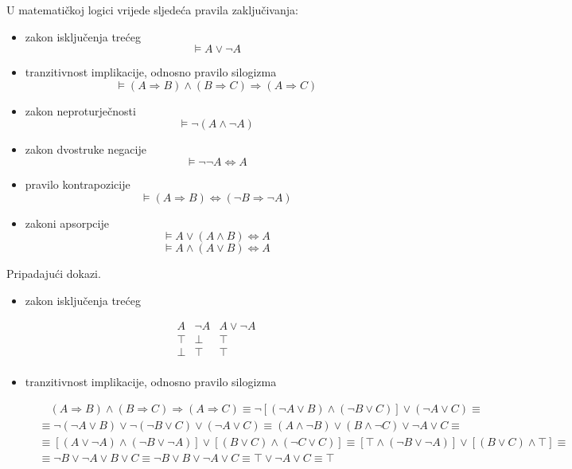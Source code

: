 \documentclass{article}
\begin{document}
\begin{enumerate}
U matematičkoj logici vrijede sljedeća pravila zaključivanja:
\begin{itemize}
\item zakon isključenja trećeg
$$\vDash A\lor\neg A$$
\item tranzitivnost implikacije, odnosno pravilo silogizma
$$\vDash ( A\Rightarrow B)\land(B\Rightarrow C)\Rightarrow(A\Rightarrow C)$$
\item zakon neproturječnosti
$$\vDash \neg( A\land\neg A)$$
\item zakon dvostruke negacije
$$\vDash \neg\neg A\Leftrightarrow A$$
\item pravilo kontrapozicije
$$\vDash(A\Rightarrow B)\Leftrightarrow(\neg B\Rightarrow\neg A)$$
\item zakoni apsorpcije
$$\vDash A\lor(A\land B)\Leftrightarrow A$$
$$\vDash A\land(A\lor B)\Leftrightarrow A$$
\end{itemize}

Pripadajući dokazi.

\begin{itemize}
\item zakon isključenja trećeg

\begin{displaymath}
\begin{array}{|c|c|c|}
A & \neg A & A\lor\neg A\\
\hline
\top & \bot & \top\\
\bot & \top & \top\\
\end{array}
\end{displaymath}

\item tranzitivnost implikacije, odnosno pravilo silogizma

\begin{align*}
&\quad(A\Rightarrow B)\land (B\Rightarrow C) \Rightarrow (A\Rightarrow C)\equiv \neg[(\neg A\lor B)\land (\neg B\lor C)]\lor(\neg A\lor C)\equiv\\
&\equiv\neg(\neg A\lor B)\lor\neg(\neg B\lor C)\lor(\neg A\lor C)\equiv(A\land\neg B)\lor (B\land\neg C)\lor\neg A\lor C\equiv\\
&\equiv[(A\lor\neg A)\land(\neg B\lor\neg A)]\lor [(B\lor C)\land(\neg C\lor C)]\equiv [\top\land(\neg B\lor\neg A)]\lor [(B\lor C)\land\top]\equiv\\
&\equiv \neg B\lor\neg A\lor B\lor C\equiv \neg B\lor B\lor\neg A\lor C\equiv \top\lor\neg A\lor C\equiv\top\\
\end{align*}


\end{itemize}
\end{enumerate}
\end{document}
